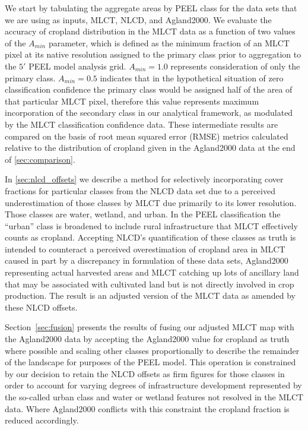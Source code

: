 We start by tabulating the aggregate areas by PEEL class for the data
sets that we are using as inputs, MLCT, NLCD, and Agland2000.  We
evaluate the accuracy of cropland distribution in the MLCT data as a
function of two values of the $A_{min}$ parameter, which is defined as
the minimum fraction of an MLCT pixel at its native resolution
assigned to the primary class prior to aggregation to the $5'$ PEEL
model analysis grid.  $A_{min}=1.0$ represents consideration of only
the primary class.  $A_{min}=0.5$ indicates that in the hypothetical
situation of zero classification confidence the primary class would be
assigned half of the area of that particular MLCT pixel, therefore
this value represents maximum incorporation of the secondary class in
our analytical framework, as modulated by the MLCT classification
confidence data.  These intermediate results are compared on the basis
of root mean squared error (RMSE) metrics calculated relative to the
distribution of cropland given in the Agland2000 data at the end of
\autoref{sec:comparison}.

In \autoref{sec:nlcd_offsets} we describe a method for selectively
incorporating cover fractions for particular classes from the NLCD
data set due to a perceived underestimation of those classes by MLCT
due primarily to its lower resolution.  Those classes are water,
wetland, and urban.  In the PEEL classification the ``urban'' class is
broadened to include rural infrastructure that MLCT effectively counts
as cropland.  Accepting NLCD's quantification of these classes as
truth is intended to counteract a perceived overestimation of cropland
area in MLCT caused in part by a discrepancy in formulation of these
data sets, Agland2000 representing actual harvested areas and MLCT
catching up lots of ancillary land that may be associated with
cultivated land but is not directly involved in crop production. The
result is an adjusted version of the MLCT data as amended by these
NLCD offsets.

Section~\ref{sec:fusion} presents the results of fusing our adjusted MLCT
map with the Agland2000 data by accepting the Agland2000 value for
cropland as truth where possible and scaling other classes
proportionally to describe the remainder of the landscape for
purposes of the PEEL model.  This operation is constrained by our
decision to retain the NLCD offsets as firm figures for those classes
in order to account for varying degrees of infrastructure development
represented by the so-called urban class and water or wetland features
not resolved in the MLCT data.  Where Agland2000 conflicts with this
constraint the cropland fraction is reduced accordingly.

